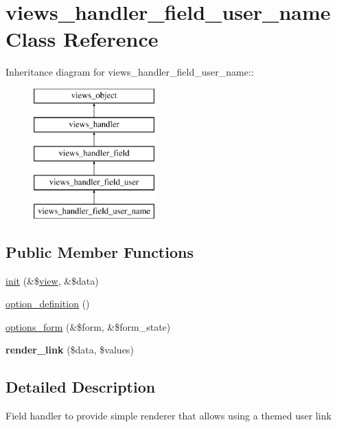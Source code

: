 \hypertarget{classviews__handler__field__user__name}{
\section{views\_\-handler\_\-field\_\-user\_\-name Class Reference}
\label{classviews__handler__field__user__name}
}
Inheritance diagram for views\_\-handler\_\-field\_\-user\_\-name::\begin{figure}[H]
\begin{center}
\leavevmode
\includegraphics[height=5cm]{classviews__handler__field__user__name}
\end{center}
\end{figure}
\subsection*{Public Member Functions}
\begin{CompactItemize}
\item 
\hyperlink{classviews__handler__field__user__name_5879bbaa4a1e59f9509b9a5d6fbdd9b2}{init} (\&\$\hyperlink{classview}{view}, \&\$data)
\item 
\hyperlink{classviews__handler__field__user__name_11092f8f1854e14f245b644a2fed8434}{option\_\-definition} ()
\item 
\hyperlink{classviews__handler__field__user__name_0c3b7db3d060e384287fa62f348c9387}{options\_\-form} (\&\$form, \&\$form\_\-state)
\item 
\hypertarget{classviews__handler__field__user__name_bb46f4d178fa916dde1592eb00b1996b}{
\textbf{render\_\-link} (\$data, \$values)}
\label{classviews__handler__field__user__name_bb46f4d178fa916dde1592eb00b1996b}

\end{CompactItemize}


\subsection{Detailed Description}
Field handler to provide simple renderer that allows using a themed user link 

